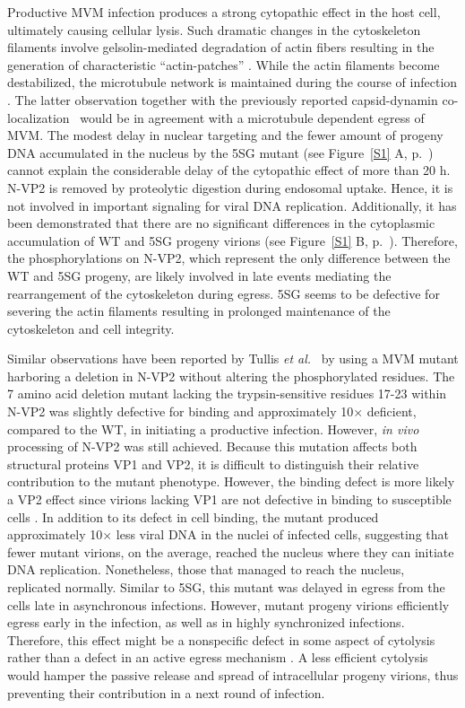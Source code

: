 Productive MVM infection produces a strong cytopathic effect in the host cell, ultimately causing cellular lysis. Such dramatic changes in the cytoskeleton filaments involve gelsolin-mediated degradation of actin fibers resulting in the generation of characteristic ``actin-patches'' \cite{pmid18704167}. While the actin filaments become destabilized, the microtubule network is maintained during the course of infection \cite{pmid15582663}. The latter observation together with the previously reported capsid-dynamin co-localization~\cite{pmid18704167} would be in agreement with a microtubule dependent egress of MVM. The modest delay in nuclear targeting and the fewer amount of progeny DNA accumulated in the nucleus by the 5SG mutant (see Figure~\ref{S1} A, p.~\pageref{S1}) cannot explain the considerable delay of the cytopathic effect of more than 20 h. N-VP2 is removed by proteolytic digestion during endosomal uptake. Hence, it is not involved in important signaling for viral DNA replication. Additionally, it has been demonstrated that there are no significant differences in the cytoplasmic accumulation of WT and 5SG progeny virions (see Figure~\ref{S1} B, p.~\pageref{S1}). Therefore, the phosphorylations on N-VP2, which represent the only difference between the WT and 5SG progeny, are likely involved in late events mediating the rearrangement of the cytoskeleton during egress. 5SG seems to be defective for severing the actin filaments resulting in prolonged maintenance of the cytoskeleton and cell integrity. 


Similar observations have been reported by Tullis \textit{et al.}~\cite{pmid1448928} by using a MVM mutant harboring a deletion in N-VP2 without altering the phosphorylated residues. The 7 amino acid deletion mutant lacking the trypsin-sensitive residues 17-23 within N-VP2 was slightly defective for binding and approximately 10$\times$ deficient, compared to the WT, in initiating a productive infection. However, \textit{in vivo} processing of N-VP2 was still achieved. Because this mutation affects both structural proteins VP1 and VP2, it is difficult to distinguish their relative contribution to the mutant phenotype. However, the binding defect is more likely a VP2 effect since virions lacking VP1 are not defective in binding to susceptible cells \cite{pmid8416366}. In addition to its defect in cell binding, the mutant produced approximately 10$\times$ less viral DNA in the nuclei of infected cells, suggesting that fewer mutant virions, on the average, reached the nucleus where they can initiate DNA replication. Nonetheless, those that managed to reach the nucleus, replicated normally. Similar to 5SG, this mutant was delayed in egress from the cells late in asynchronous infections. However, mutant progeny virions efficiently egress early in the infection, as well as in highly synchronized infections. Therefore, this effect might be a nonspecific defect in some aspect of cytolysis rather than a defect in an active egress mechanism \cite{pmid1448928}. A less efficient cytolysis would hamper the passive release and spread of intracellular progeny virions, thus preventing their contribution in a next round of infection.

